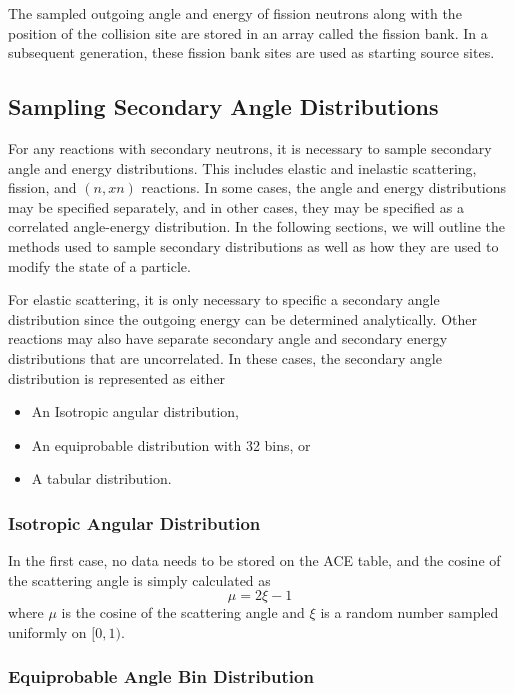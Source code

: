 The sampled outgoing angle and energy of fission neutrons along with the
position of the collision site are stored in an array called the fission
bank. In a subsequent generation, these fission bank sites are used as starting
source sites.

\subsection{Sampling Secondary Angle Distributions}
\label{sec:sample-angle}

For any reactions with secondary neutrons, it is necessary to sample secondary
angle and energy distributions. This includes elastic and inelastic scattering,
fission, and $(n,xn)$ reactions. In some cases, the angle and energy
distributions may be specified separately, and in other cases, they may be
specified as a correlated angle-energy distribution. In the following sections,
we will outline the methods used to sample secondary distributions as well as
how they are used to modify the state of a particle.

For elastic scattering, it is only necessary to specific a secondary angle
distribution since the outgoing energy can be determined analytically. Other
reactions may also have separate secondary angle and secondary energy
distributions that are uncorrelated. In these cases, the secondary angle
distribution is represented as either
\begin{itemize}
\item An Isotropic angular distribution,
\item An equiprobable distribution with 32 bins, or
\item A tabular distribution.
\end{itemize}

\subsubsection{Isotropic Angular Distribution}

In the first case, no data needs to be stored on the ACE table, and the cosine
of the scattering angle is simply calculated as
\begin{equation}
  \label{eq:isotropic-angle}
  \mu = 2\xi - 1
\end{equation}
where $\mu$ is the cosine of the scattering angle and $\xi$ is a random number
sampled uniformly on $[0,1)$.

\subsubsection{Equiprobable Angle Bin Distribution}

